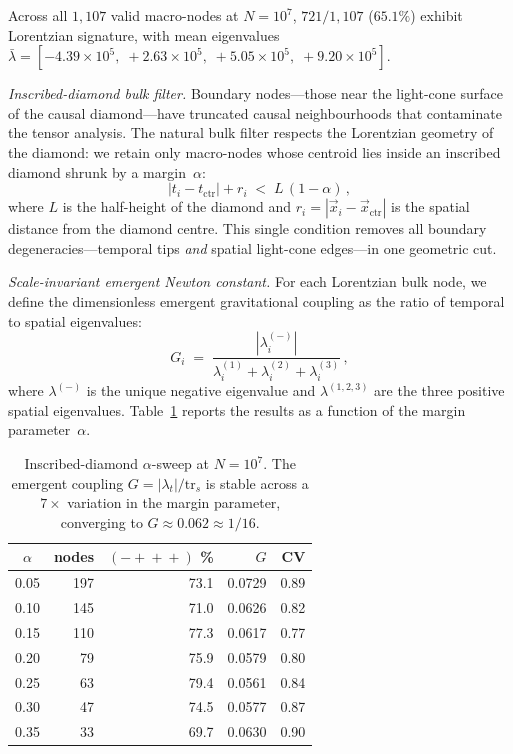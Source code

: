 \documentclass[aps,prd,twocolumn,superscriptaddress,nofootinbib,amsmath,amssymb,longbibliography]{revtex4-2}
\begin{document}
Across all $1{,}107$ valid macro-nodes at $N = 10^{7}$,
$721/1{,}107$ ($65.1\%$) exhibit Lorentzian signature, with mean
eigenvalues
$\bar{\lambda} = [-4.39 \times 10^5,\; +2.63 \times 10^5,\;
+5.05 \times 10^5,\; +9.20 \times 10^5]$.

\emph{Inscribed-diamond bulk filter.}
Boundary nodes---those near the light-cone surface of the causal
diamond---have truncated causal neighbourhoods that contaminate the
tensor analysis.  The natural bulk filter respects the Lorentzian
geometry of the diamond: we retain only macro-nodes whose centroid
lies inside an inscribed diamond shrunk by a margin~$\alpha$:
\begin{equation}\label{eq:inscribed-diamond}
  |t_i - t_{\mathrm{ctr}}| + r_i \;<\; L\,(1 - \alpha)\,,
\end{equation}
where $L$ is the half-height of the diamond and
$r_i = |\vec{x}_i - \vec{x}_{\mathrm{ctr}}|$ is the spatial distance
from the diamond centre.  This single condition removes all boundary
degeneracies---temporal tips \emph{and} spatial light-cone edges---in
one geometric cut.

\emph{Scale-invariant emergent Newton constant.}
For each Lorentzian bulk node, we define the dimensionless emergent
gravitational coupling as the ratio of temporal to spatial eigenvalues:
\begin{equation}\label{eq:emergent-G}
  G_i \;=\; \frac{|\lambda^{(-)}_i|}
                  {\lambda^{(1)}_i + \lambda^{(2)}_i + \lambda^{(3)}_i}\,,
\end{equation}
where $\lambda^{(-)}$ is the unique negative eigenvalue and
$\lambda^{(1,2,3)}$ are the three positive spatial eigenvalues.
Table~\ref{tab:alpha-sweep} reports the results as a function of the
margin parameter~$\alpha$.

\begin{table}[h]
\centering
\caption{Inscribed-diamond $\alpha$-sweep at $N = 10^{7}$.
The emergent coupling $G = |\lambda_t|/\mathrm{tr}_s$ is stable
across a $7\times$ variation in the margin parameter, converging
to $G \approx 0.062 \approx 1/16$.}
\label{tab:alpha-sweep}
\begin{ruledtabular}
\begin{tabular}{c r r r r}
  $\alpha$ & nodes & $(-\!+\!+\!+)$ \% & $G$ & CV \\
  \hline
  0.05 & 197 & 73.1 & 0.0729 & 0.89 \\
  0.10 & 145 & 71.0 & 0.0626 & 0.82 \\
  0.15 & 110 & 77.3 & 0.0617 & 0.77 \\
  0.20 &  79 & 75.9 & 0.0579 & 0.80 \\
  0.25 &  63 & 79.4 & 0.0561 & 0.84 \\
  0.30 &  47 & 74.5 & 0.0577 & 0.87 \\
  0.35 &  33 & 69.7 & 0.0630 & 0.90 \\
\end{tabular}
\end{ruledtabular}
\end{table}
\end{document}
